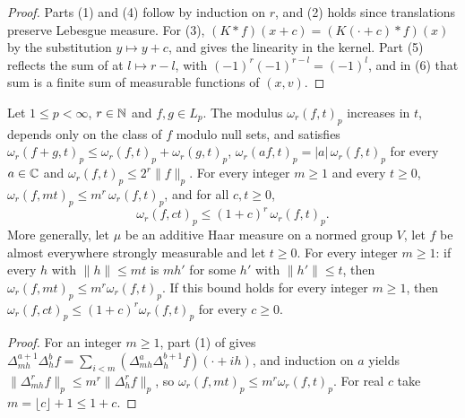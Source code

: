 \begin{proof}
\leanok
Parts (1) and (4) follow by induction on $r$, and (2) holds since translations preserve Lebesgue
measure. For (3), $(K * f)(x + c) = (K(\cdot + c) * f)(x)$ by the substitution $y \mapsto y + c$,
and  gives the linearity in the kernel. Part (5) reflects the sum of
 at $l \mapsto r - l$, with $(-1)^r (-1)^{r-l} = (-1)^l$, and in (6) that
sum is a finite sum of measurable functions of $(x, v)$.
\end{proof}

\begin{lemma}
\label{lem:rd-modulus}
\leanok
{}
Let $1 \leq p < \infty$, $r \in \mathbb{N}$ and $f, g \in L_p$. The modulus $\omega_r(f, t)_p$ increases
in $t$, depends only on the class of $f$ modulo null sets, and satisfies
$\omega_r(f + g, t)_p \leq \omega_r(f, t)_p + \omega_r(g, t)_p$,
$\omega_r(a f, t)_p = |a| \, \omega_r(f, t)_p$ for every $a \in \mathbb{C}$ and
$\omega_r(f, t)_p \leq 2^r \|f\|_p$. For every integer $m \geq 1$ and every $t \geq 0$,
$\omega_r(f, m t)_p \leq m^r \, \omega_r(f, t)_p$, and for all $c, t \geq 0$,
\[
  \omega_r(f, c t)_p \leq (1 + c)^r \, \omega_r(f, t)_p .
\]
More generally, let $\mu$ be an additive Haar measure on a normed group $V$, let $f$ be almost
everywhere strongly measurable and let $t \geq 0$. For every integer $m \geq 1$: if every $h$
with $\|h\| \leq m t$ is $m h'$ for some $h'$ with $\|h'\| \leq t$, then
$\omega_r(f, m t)_p \leq m^r \omega_r(f, t)_p$. If this bound holds for every integer
$m \geq 1$, then $\omega_r(f, c t)_p \leq (1 + c)^r \omega_r(f, t)_p$ for every $c \geq 0$.
\end{lemma}

\begin{proof}
\leanok
For an integer $m \geq 1$, part (1) of  gives
$\Delta_{mh}^{a+1} \Delta_h^b f = \sum_{i<m} (\Delta_{mh}^a \Delta_h^{b+1} f)(\cdot + i h)$, and
induction on $a$ yields $\|\Delta_{mh}^r f\|_p \leq m^r \|\Delta_h^r f\|_p$, so
$\omega_r(f, m t)_p \leq m^r \omega_r(f, t)_p$. For real $c$ take
$m = \lfloor c \rfloor + 1 \leq 1 + c$.
\end{proof}

